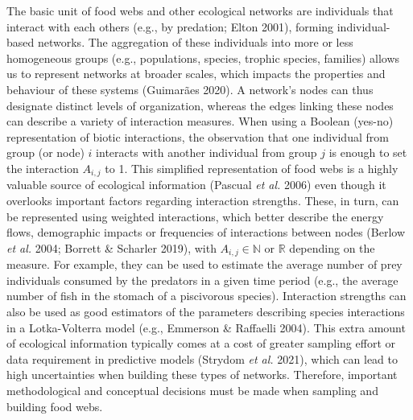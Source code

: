 \documentclass[11pt]{article}
\begin{document}
The basic unit of food webs and other ecological networks are
individuals that interact with each others (e.g., by predation; Elton
2001), forming individual-based networks. The aggregation of these
individuals into more or less homogeneous groups (e.g., populations,
species, trophic species, families) allows us to represent networks at
broader scales, which impacts the properties and behaviour of these
systems (Guimarães 2020). A network's nodes can thus designate distinct
levels of organization, whereas the edges linking these nodes can
describe a variety of interaction measures. When using a Boolean
(yes-no) representation of biotic interactions, the observation that one
individual from group (or node) \(i\) interacts with another individual
from group \(j\) is enough to set the interaction \(A_{i,j}\) to 1. This
simplified representation of food webs is a highly valuable source of
ecological information (Pascual \emph{et al.} 2006) even though it
overlooks important factors regarding interaction strengths. These, in
turn, can be represented using weighted interactions, which better
describe the energy flows, demographic impacts or frequencies of
interactions between nodes (Berlow \emph{et al.} 2004; Borrett \&
Scharler 2019), with \(A_{i,j} \in \mathbb{N}\) or \(\mathbb{R}\)
depending on the measure. For example, they can be used to estimate the
average number of prey individuals consumed by the predators in a given
time period (e.g., the average number of fish in the stomach of a
piscivorous species). Interaction strengths can also be used as good
estimators of the parameters describing species interactions in a
Lotka-Volterra model (e.g., Emmerson \& Raffaelli 2004). This extra
amount of ecological information typically comes at a cost of greater
sampling effort or data requirement in predictive models (Strydom
\emph{et al.} 2021), which can lead to high uncertainties when building
these types of networks. Therefore, important methodological and
conceptual decisions must be made when sampling and building food webs.
\end{document}
